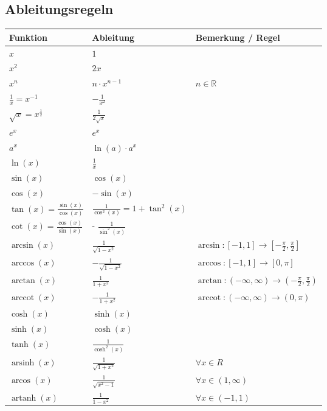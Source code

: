 \documentclass[25pt]{sciposter}
\newcommand{\R}{\mathbb{R}}
\begin{document}
\begin{multicols}{3}
\subsection*{Ableitungsregeln}

{\renewcommand{\arraystretch}{1.5}
\begin{table}[]
	\begin{tabular}{@{} p{} p{} p{} @{}}
		\toprule
		Funktion & Ableitung & Bemerkung / Regel\\ \midrule
		  $x$ & $1$ &   \\
		  $x^2$& $2x$ &   \\
		  $x^n$& $n\cdot x^{n-1}$ & $n \in \R$  \\
		  $\frac{1}{x} = x^{-1}$ & $- \frac{1}{x^2}$ & \\
		  $\sqrt{x} = x^{\frac{1}{2}}$ & $\frac{1}{2\sqrt{x}}$ & \\ 
		   $e^x$ & $e^x$ & \\
		  $a^x$ & $\ln(a) \cdot a^x$& \\
		  $\ln(x)$ & $\frac{1}{x}$ & \\ \midrule
		  $\sin(x)$ & $\cos(x)$ & \\
		  $\cos(x)$ & $- \sin(x)$ & \\ 
		  $\tan(x) = \frac{\sin(x)}{\cos(x)}$ & $\frac{1}{\cos^2(x)} = 1 + \tan^2(x)$ &\\
		  $\cot(x) = \frac{\cos(x)}{\sin(x)}$ & - $\frac{1}{\sin^2(x)}$ & \\ 
		  $\arcsin(x)$ & $\frac{1}{\sqrt{1 - x^2}}$ & $ \arcsin : [-1,1] \to [-\frac{\pi}{2},\frac{\pi}{2}]$\\
		  $\arccos(x)$ & $ - \frac{1}{\sqrt{1-x^2}}$ & $\arccos : [-1,1] \to [0, \pi]$\\
		  $\arctan(x)$ & $\frac{1}{1+x^2}$ & $\arctan:(-\infty, \infty) \to (- \frac{\pi}{2},\frac{\pi}{2})$\\
		  $\operatorname{arccot}(x)$ & $ - \frac{1}{1+x^2} $ & $\operatorname{arccot} : (-\infty, \infty) \to (0,\pi)$\\
		  \midrule
		  $\cosh(x)$ & $\sinh(x)$ &\\
		  $\sinh(x)$ & $\cosh(x)$ & \\
		  $\tanh(x)$ & $\frac{1}{\cosh^2(x)}$ & \\
		  $\operatorname{arsinh}(x)$ & $\frac{1}{\sqrt{1+x^2}}$ & $\forall x \in R$\\
		  $\operatorname{arcos}(x)$ & $\frac{1}{\sqrt{x^2 - 1}}$ & $\forall x \in (1, \infty)$\\		  $\operatorname{artanh}(x)$ & $\frac{1}{1-x^2}$ & $\forall x \in (-1,1)$\\

\end{tabular}
\end{table}}
\end{multicols}
\end{document}
